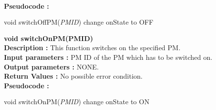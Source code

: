 \documentclass[a4paper,11pt]{article}
\begin{document}
\\
\textbf{Pseudocode :}
\begin{algorithmic}[1]
\STATE void switchOffPM(\emph{PM\textunderscore ID})
\STATE change onState to OFF
\ENDIF
\ENDFOR
\end{algorithmic}
\textbf{ void switchOnPM(PM\textunderscore ID)}
\\
\textbf{Description :} This function switches on the specified PM.
\\
\textbf{Input parameters :} PM ID of the PM which has to be switched on.
\\
\textbf{Output parameters :} NONE.
\\
\textbf{Return Values :} No possible error condition.
\\
\textbf{Pseudocode :}
\begin{algorithmic}[1]
\STATE void switchOnPM(\emph{PM\textunderscore ID})
\STATE change onState to ON
\ENDIF
\ENDFOR
\end{algorithmic}
\end{document}
